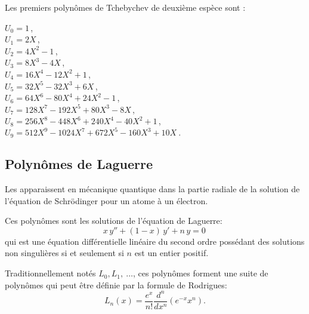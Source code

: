 \medskip
{}
Les premiers polynômes de Tchebychev de deuxième espèce sont :

\noindent
    $U_0 = 1 \,$,\\
    $U_1 = 2X \,$,\\
    $U_2 = 4X^2 - 1 \,$,\\
    $U_3 = 8X^3 - 4X \,$,\\
    $U_4 = 16X^4 - 12X^2 + 1 \,$,\\
    $U_5 = 32X^5 - 32X^3 + 6X \,$,\\
    $U_6 = 64X^6 - 80X^4 + 24X^2 - 1 \,$,\\
    $U_7 = 128X^7 - 192X^5 + 80X^3 - 8X \,$,\\
    $U_8 = 256X^8 - 448 X^6 + 240 X^4 - 40 X^2 + 1 \,$,\\
    $U_9 = 512X^9 - 1024 X^7 + 672 X^5 - 160 X^3 + 10 X~. $



\medskip
\subsection{Polynômes de Laguerre}

Les  apparaissent en mécanique quantique dans la partie radiale 
de la solution de l'équation de Schrödinger 
pour un atome à un électron.

\medskip
Ces polynômes sont les solutions de l'équation de Laguerre:
\begin{equation}
    x\,y'' + (1 - x)\,y' + n\,y = 0\,
\end{equation}
qui est une équation différentielle linéaire du second ordre possédant des solutions non 
singulières si et seulement si $n$ est un entier positif.

\medskip
Traditionnellement notés $L_0, L_1,\ \dots$, ces polynômes forment une suite de 
polynômes qui peut être définie par la formule de Rodrigues:
\begin{equation}
    L_n(x)=\frac{e^x}{n!}\frac{d^n}{dx^n}\left(e^{-x} x^n\right). 
\end{equation}

